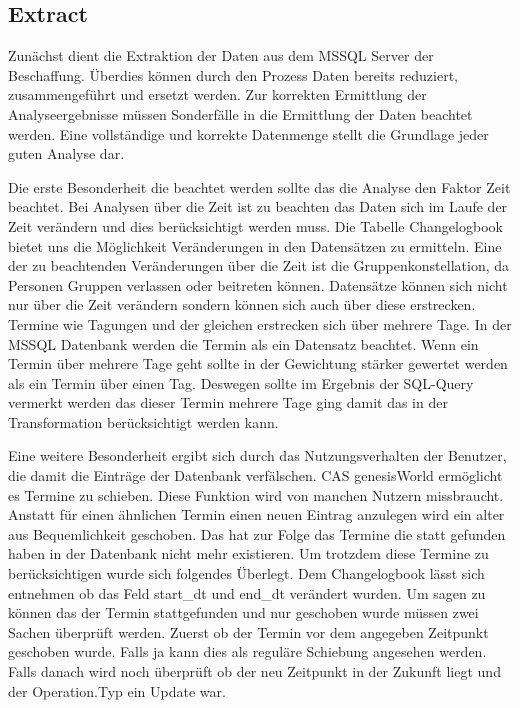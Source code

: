 \subsection{Extract}

Zunächst dient die Extraktion der Daten aus dem MSSQL Server der Beschaffung. Überdies können durch den Prozess Daten bereits reduziert,  zusammengeführt und ersetzt werden. Zur korrekten Ermittlung der Analyseergebnisse müssen Sonderfälle in die Ermittlung der Daten beachtet werden. Eine vollständige und korrekte Datenmenge stellt die Grundlage jeder guten Analyse dar.

Die erste Besonderheit die beachtet werden sollte das die Analyse den Faktor Zeit beachtet. Bei Analysen über die Zeit ist zu beachten das Daten sich im Laufe der Zeit verändern und dies berücksichtigt werden muss. Die Tabelle Changelogbook bietet uns die Möglichkeit Veränderungen in den Datensätzen zu ermitteln. Eine der zu beachtenden Veränderungen über die Zeit ist die Gruppenkonstellation, da Personen Gruppen verlassen oder beitreten können. Datensätze können sich nicht nur über die Zeit verändern sondern können sich auch über diese erstrecken. Termine wie Tagungen und der gleichen erstrecken sich über mehrere Tage. In der MSSQL Datenbank werden die Termin als ein Datensatz beachtet. Wenn ein Termin über mehrere Tage geht sollte in der Gewichtung stärker gewertet werden als ein Termin über einen Tag. Deswegen sollte im Ergebnis der SQL-Query vermerkt werden das dieser Termin mehrere Tage ging damit das in der Transformation berücksichtigt werden kann. 

Eine weitere Besonderheit ergibt sich durch das Nutzungsverhalten der Benutzer, die damit die Einträge der Datenbank verfälschen. CAS genesisWorld ermöglicht es Termine zu schieben. Diese Funktion wird von manchen Nutzern missbraucht. Anstatt für einen ähnlichen Termin einen neuen Eintrag anzulegen wird ein alter aus Bequemlichkeit geschoben. Das hat zur Folge das Termine die statt gefunden haben in der Datenbank nicht mehr existieren. Um trotzdem diese Termine zu berücksichtigen wurde sich folgendes Überlegt. Dem Changelogbook lässt sich entnehmen ob das Feld start\_dt und end\_dt verändert wurden. Um sagen zu können das der Termin stattgefunden und nur geschoben wurde müssen zwei Sachen überprüft werden. Zuerst ob der Termin vor dem angegeben Zeitpunkt geschoben wurde. Falls ja kann dies als reguläre Schiebung angesehen werden. Falls danach wird noch überprüft ob der neu Zeitpunkt in der Zukunft liegt und der Operation.Typ ein Update war. 

